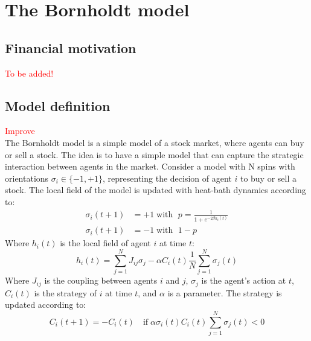\section{The Bornholdt model}
\subsection{Financial motivation}
\textcolor{red}{To be added!}\\
\subsection{Model definition}
\textcolor{red}{Improve}\\
The Bornholdt model is a simple model of a stock market, where agents can buy or sell a stock. The idea is to have a simple model that can capture the strategic interaction between agents in the market. Consider a model with N spins with orientations $\sigma_i\in\{-1,+1\}$, representing the decision of agent $i$ to buy or sell a stock. The local field of the model is updated with heat-bath dynamics according to:
\begin{equation}
    \begin{aligned}
        \sigma_i(t+1) &= +1 \;\text{with }\; p = \frac{1}{1+e^{-2\beta h_i(t)}}\\
        \sigma_i(t+1) &= -1 \;\text{with }\; 1-p
    \end{aligned}
\end{equation}
Where $h_i(t)$ is the local field of agent $i$ at time $t$:
\begin{equation}
    h_i(t)=\sum_{j=1}^N J_{i j} \sigma_j-\alpha C_i(t) \frac{1}{N} \sum_{j=1}^N \sigma_j(t)
\end{equation}
Where $J_{i j}$ is the coupling between agents $i$ and $j$, $\sigma_j$ is the agent's action at $t$, $C_i(t)$ is the strategy of $i$ at time $t$, and $\alpha$ is a parameter. The strategy is updated according to:
\begin{equation}
    C_i(t+1) = -C_i(t) \quad\text{if} \; \alpha\sigma_i(t)C_i(t) \sum_{j=1}^N \sigma_j(t)< 0
\end{equation}